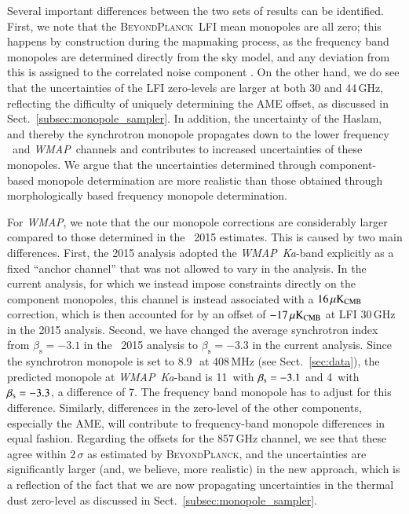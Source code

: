 \documentclass[twocolumn]{aa}
\def\WMAP{\emph{WMAP}}
\newcommand{\BP}{\textsc{BeyondPlanck}}
\begin{document}
Several important differences between the two sets of results can be
identified. First, we note that the \BP\ LFI mean monopoles are all
zero; this happens by construction during the mapmaking process, as
the frequency band monopoles are determined directly from the sky
model, and any deviation from this is assigned to the correlated noise
component \citep{bp06}. On the other hand, we do see that the
uncertainties of the LFI zero-levels are larger at both 30 and
44\,GHz, reflecting the difficulty of uniquely determining the AME
offset, as discussed in Sect.~\ref{subsec:monopole_sampler}.
In addition, the uncertainty of the Haslam, and thereby the synchrotron monopole
propagates down to the lower frequency \Planck\ and \WMAP\ channels and
contributes to increased uncertainties of these monopoles. We argue
that the uncertainties determined through component-based monopole
determination are more realistic than those obtained through
morphologically based frequency monopole determination.

For \WMAP, we note that the our monopole corrections are considerably
larger compared to those determined in the \Planck\ 2015
estimates. This is caused by two main differences. First, the 2015
analysis adopted the \WMAP\ \textit{Ka}-band explicitly as a fixed ``anchor
channel'' \citep{planck2014-a12} that was not allowed to vary in the
analysis. In the current analysis, for which we instead impose
constraints directly on the component monopoles, this channel is
instead associated with a $16\muKCMB$ correction, which is then accounted
for by an offset of $-17\muKCMB$ at LFI 30\,GHz in the 2015
analysis. Second, we have changed the average synchrotron index from
$\beta_{\mathrm{s}}=-3.1$ in the \Planck\ 2015 analysis
\citep{planck2014-a12} to $\beta_{\mathrm{s}}=-3.3$ in the current
analysis. Since the synchrotron monopole is set to 8.9\,\KRJ\ at
408\,MHz (see Sect.~\ref{sec:data}), the predicted monopole at
\WMAP\ \textit{Ka}-band is 11\muKCMB\ with $\bsynch=-3.1$ and 4\muKCMB\ with
$\bsynch=-3.3$, a difference of 7\muKCMB. The frequency band monopole
has to adjust for this difference. Similarly, differences in the
zero-level of the other components, especially the AME, will
contribute to frequency-band monopole differences in equal
fashion. Regarding the offsets for the 857\,GHz channel, we see that
these agree within $2\,\sigma$ as estimated by \BP, and the
uncertainties are significantly larger (and, we believe, more
realistic) in the new approach, which is a reflection of the fact that
we are now propagating uncertainties in the thermal dust zero-level as
discussed in Sect.~\ref{subsec:monopole_sampler}.
\end{document}
